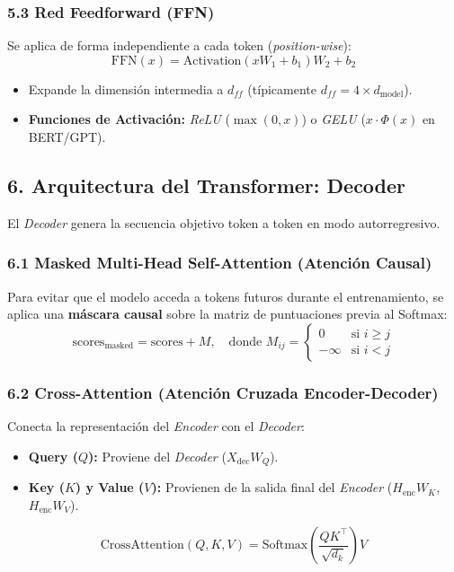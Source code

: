 \subsubsection{5.3 Red Feedforward (FFN)}

Se aplica de forma independiente a cada token (\emph{position-wise}):
$$\text{FFN}(x) = \text{Activation}(x W_1 + b_1) W_2 + b_2$$
\begin{itemize}
	\item Expande la dimensión intermedia a $d_{ff}$ (típicamente $d_{ff} = 4 \times d_{\text{model}}$).
	\item \textbf{Funciones de Activación:} \emph{ReLU} ($\max(0, x)$) o \emph{GELU} ($x \cdot \Phi(x)$ en BERT/GPT).
\end{itemize}

\subsection{6. Arquitectura del Transformer: Decoder}

El \emph{Decoder} genera la secuencia objetivo token a token en modo autorregresivo.

\subsubsection{6.1 Masked Multi-Head Self-Attention (Atención Causal)}

Para evitar que el modelo acceda a tokens futuros durante el entrenamiento, se aplica una \textbf{máscara causal} sobre la matriz de puntuaciones previa al Softmax:
$$\text{scores}_{\text{masked}} = \text{scores} + M, \quad \text{donde } M_{ij} = \begin{cases} 0 & \text{si } i \ge j \\ -\infty & \text{si } i < j \end{cases}$$

\subsubsection{6.2 Cross-Attention (Atención Cruzada Encoder-Decoder)}

Conecta la representación del \emph{Encoder} con el \emph{Decoder}:
\begin{itemize}
	\item \textbf{Query ($Q$):} Proviene del \emph{Decoder} ($X_{\text{dec}} W_Q$).
	\item \textbf{Key ($K$) y Value ($V$):} Provienen de la salida final del \emph{Encoder} ($H_{\text{enc}} W_K$, $H_{\text{enc}} W_V$).
\end{itemize}
$$\text{CrossAttention}(Q, K, V) = \text{Softmax}\left( \frac{Q K^\top}{\sqrt{d_k}} \right) V$$

